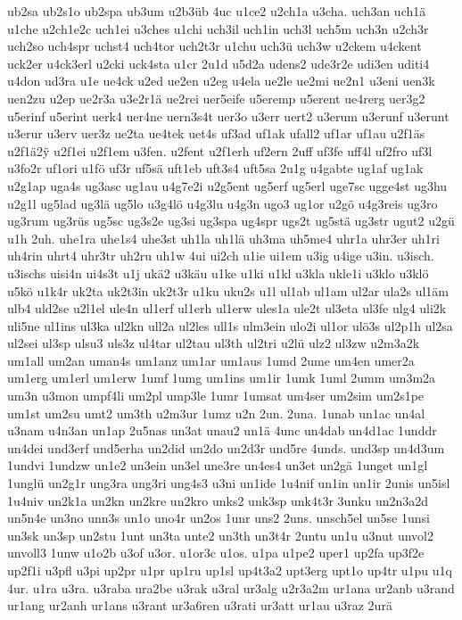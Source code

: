 {ub2sa
ub2s1o
ub2spa
ub3um
u2b3üb
4uc
u1ce2
u2ch1a
u3cha.
uch3an
uch1ä
u1che
u2ch1e2c
uch1ei
u3ches
u1chi
uch3il
uch1in
uch3l
uch5m
uch3n
u2ch3r
uch2so
uch4spr
uchst4
uch4tor
uch2t3r
u1chu
uch3ü
uch3w
u2ckem
u4ckent
uck2er
u4ck3erl
u2cki
uck4sta
u1cr
2u1d
u5d2a
udens2
ude3r2e
udi3en
uditi4
u4don
ud3ra
u1e
ue4ck
u2ed
ue2en
u2eg
u4ela
ue2le
ue2mi
ue2n1
u3eni
uen3k
uen2zu
u2ep
ue2r3a
u3e2r1ä
ue2rei
uer5eife
u5eremp
u5erent
ue4rerg
uer3g2
u5erinf
u5erint
uerk4
uer4ne
uern3s4t
uer3o
u3err
uert2
u3erum
u3erunf
u3erunt
u3erur
u3erv
uer3z
ue2ta
ue4tek
uet4s
uf3ad
uf1ak
ufall2
uf1ar
uf1au
u2f1äs
u2f1ä2^^ff
u2f1ei
u2f1em
u3fen.
u2fent
u2f1erh
uf2ern
2uff
uf3fe
uff4l
uf2fro
uf3l
u3fo2r
uf1ori
u1fö
uf3r
uf5sä
uft1eb
uft3s4
uft5sa
2u1g
u4gabte
ug1af
ug1ak
u2g1ap
uga4s
ug3asc
ug1au
u4g7e2i
u2g5ent
ug5erf
ug5erl
uge7sc
ugge4st
ug3hu
u2g1l
ug5lad
ug3lä
ug5lo
u3g4lö
u4g3lu
u4g3n
ugo3
ug1or
u2gö
u4g3reis
ug3ro
ug3rum
ug3rüs
ug5sc
ug3s2e
ug3si
ug3spa
ug4spr
ugs2t
ug5stä
ug3str
ugut2
u2gü
u1h
2uh.
uhe1ra
uhe1s4
uhe3st
uh1la
uh1lä
uh3ma
uh5me4
uhr1a
uhr3er
uh1ri
uh4rin
uhrt4
uhr3tr
uh2ru
uh1w
4ui
ui2ch
u1ie
ui1em
u3ig
u4ige
u3in.
u3isch.
u3ischs
uisi4n
ui4s3t
u1j
ukä2
u3käu
u1ke
u1ki
u1kl
u3kla
ukle1i
u3klo
u3klö
u5kö
u1k4r
uk2ta
uk2t3in
uk2t3r
u1ku
uku2s
u1l
ul1ab
ul1am
ul2ar
ula2s
ul1äm
ulb4
uld2se
u2l1el
ule4n
ul1erf
ul1erh
ul1erw
ules1a
ule2t
ul3eta
ul3fe
ulg4
uli2k
uli5ne
ul1ins
ul3ka
ul2kn
ull2a
ul2les
ull1s
ulm3ein
ulo2i
ul1or
ulö3s
ul2p1h
ul2sa
ul2sei
ul3sp
ulsu3
uls3z
ul4tar
ul2tau
ul3th
ul2tri
u2lü
ulz2
ul3zw
u2m3a2k
um1all
um2an
uman4s
um1anz
um1ar
um1aus
1umd
2ume
um4en
umer2a
um1erg
um1erl
um1erw
1umf
1umg
um1ins
um1ir
1umk
1uml
2umm
um3m2a
um3n
u3mon
umpf4li
um2pl
ump3le
1umr
1umsat
um4ser
um2sim
um2s1pe
um1st
um2su
umt2
um3th
u2m3ur
1umz
u2n
2un.
2una.
1unab
un1ac
un4al
u3nam
u4n3an
un1ap
2u5nas
un3at
unau2
un1ä
4unc
un4dab
un4d1ac
1unddr
un4dei
und3erf
und5erha
un2did
un2do
un2d3r
und5re
4unds.
und3sp
un4d3um
1undvi
1undzw
un1e2
un3ein
un3el
une3re
un4es4
un3et
un2gä
1unget
un1gl
1unglü
un2g1r
ung3ra
ung3ri
ung4s3
u3ni
un1ide
1u4nif
un1in
un1ir
2unis
un5isl
1u4niv
un2k1a
un2kn
un2kre
un2kro
unks2
unk3sp
unk4t3r
3unku
un2n3a2d
un5n4e
un3no
unn3s
un1o
uno4r
un2os
1unr
uns2
2uns.
unsch5el
un5se
1unsi
un3sk
un3sp
un2stu
1unt
un3ta
unte2
un3th
un3t4r
2untu
un1u
u3nut
unvol2
unvoll3
1unw
u1o2b
u3of
u3or.
u1or3c
u1os.
u1pa
u1pe2
uper1
up2fa
up3f2e
up2f1i
u3pfl
u3pi
up2pr
u1pr
up1ru
up1sl
up4t3a2
upt3erg
upt1o
up4tr
u1pu
u1q
4ur.
u1ra
u3ra.
u3raba
ura2be
u3rak
u3ral
ur3alg
u2r3a2m
ur1ana
ur2anb
u3rand
ur1ang
ur2anh
ur1ans
u3rant
ur3a6ren
u3rati
ur3att
ur1au
u3raz
2urä
}
